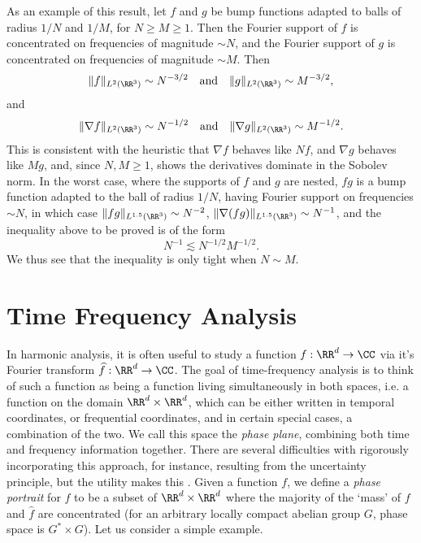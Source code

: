As an example of this result, let $f$ and $g$ be bump functions adapted to balls of radius $1/N$ and $1/M$, for $N \geq M \geq 1$. Then the Fourier support of $f$ is concentrated on frequencies of magnitude $\sim N$, and the Fourier support of $g$ is concentrated on frequencies of magnitude $\sim M$. Then
%
\[ \| f \|_{L^2(\RR^3)} \sim N^{-3/2} \quad\text{and}\quad \| g \|_{L^2(\RR^3)} \sim M^{-3/2}, \]
%
and
%
\[ \| \nabla f \|_{L^2(\RR^3)} \sim N^{-1/2} \quad\text{and}\quad \| \nabla g \|_{L^2(\RR^3)} \sim M^{-1/2}. \]
%
This is consistent with the heuristic that $\nabla f$ behaves like $N f$, and $\nabla g$ behaves like $M g$, and, since $N,M \geq 1$, shows the derivatives dominate in the Sobolev norm. In the worst case, where the supports of $f$ and $g$ are nested, $fg$ is a bump function adapted to the ball of radius $1/N$, having Fourier support on frequencies $\sim N$, in which case $\| f g \|_{L^{1.5}(\RR^3)} \sim N^{-2}$, $\| \nabla (f g) \|_{L^{1.5}(\RR^3)} \sim N^{-1}$, and the inequality above to be proved is of the form
%
\[ N^{-1} \lesssim N^{-1/2} M^{-1/2}. \]
%
We thus see that the inequality is only tight when $N \sim M$.










\chapter{Time Frequency Analysis}

In harmonic analysis, it is often useful to study a function $f: \RR^d \to \CC$ via it's Fourier transform $\widehat{f}: \RR^d \to \CC$. The goal of time-frequency analysis is to think of such a function as being a function living simultaneously in both spaces, i.e. a function on the domain $\RR^d \times \RR^d$, which can be either written in temporal coordinates, or frequential coordinates, and in certain special cases, a combination of the two. We call this space the \emph{phase plane}, combining both time and frequency information together. There are several difficulties with rigorously incorporating this approach, for instance, resulting from the uncertainty principle, but the utility makes this . Given a function $f$, we define a \emph{phase portrait} for $f$ to be a subset of $\RR^d \times \RR^d$ where the majority of the `mass' of $f$ and $\widehat{f}$ are concentrated (for an arbitrary locally compact abelian group $G$, phase space is $G^* \times G$). Let us consider a simple example.

